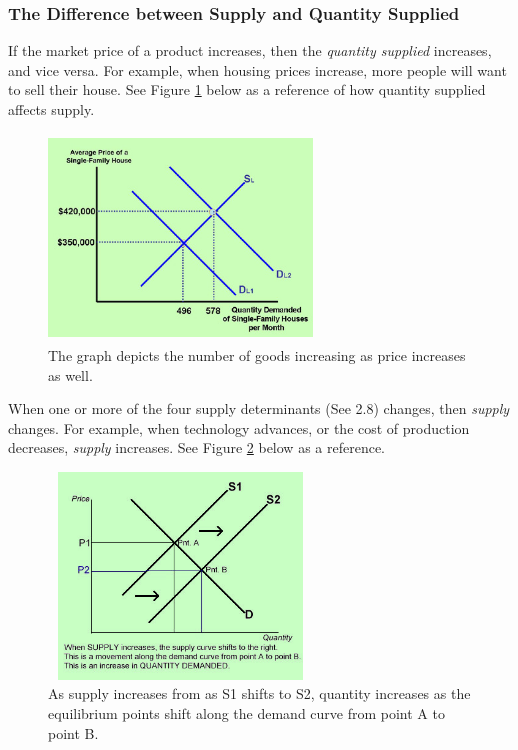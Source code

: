\documentclass[a4paper, 12pt] {article}
\begin{document}
\subsubsection{The Difference between Supply and Quantity Supplied}
If the market price of a product increases, then the \emph{quantity supplied}
increases, and vice versa. For example, when housing prices increase, more
people will want to sell their house. See Figure \ref{fig:quant_supp} below as a
reference of how quantity supplied affects supply.
\begin{figure}[ht]
    \center
    \includegraphics[height=5.5cm, width=7cm]{quantity_supplied.jpg}
    \caption{The graph depicts the number of goods increasing as price increases
    as well.}
    \label{fig:quant_supp}
\end{figure}

When one or more of the four supply determinants (See 2.8) changes, then \emph{
supply} changes. For example, when technology advances, or the cost of production
decreases, \emph{supply} increases. See Figure \ref{fig:supply_quant_shift} below 
as a reference.
\begin{figure}[ht]
    \center
    \includegraphics[height=5.5cm, width=7cm]{supply_quant_shift.jpg}
    \caption{As supply increases from as S1 shifts to S2, quantity increases as
    the equilibrium points shift along the demand curve from point A to point B.}
    \label{fig:supply_quant_shift}
\end{figure}
\end{document}
